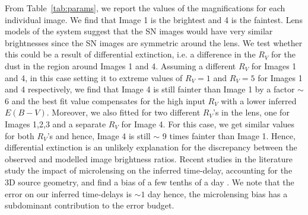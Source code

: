 \documentclass[a4paper,fleqn,usenatbib]{mnras}
\begin{document}
From Table~\ref{tab:params}, we report the values of the magnifications for each individual image. We find that Image 1 is the brightest and 4 is the faintest. Lens models of the system \citep[e.g.][M{\"o}rtsell et al. in prep.]{2017ApJ...835L..25M} suggest that the SN images would have very similar brightnesses since the SN images are symmetric around the lens. We test whether this could be a result of differential extinction, i.e. a difference in the $R_V$ for the dust in the region around Images 1 and 4. Assuming a different $R_V$ for Images 1 and 4, in this case setting it to extreme values of $R_V = 1$ and $R_V = 5$ for Images 1 and 4 respectively, we find that Image 4 is still fainter than Image 1 by a factor $\sim$ 6 and the best fit value compensates for the high input $R_V$ with a lower inferred $E(B-V)$. Moreover, we also fitted for two different $R_V$'s in the lens, one for Images 1,2,3 and a separate $R_V$ for Image 4. For this case, we get similar values for both $R_V$'s and hence, Image 4 is still $\sim$ 9 times fainter than Image 1.  Hence, differential extinction is an unlikely explanation for the discrepancy between the observed and modelled image brightness ratios. Recent studies in the literature study the impact of microlensing on the inferred time-delay, accounting for the 3D source geometry, and find a bias of a few tenths of a day \citep{2019A&A...621A..55B}. We note that the error on our inferred time-delays is $\sim 1$ day hence, the microlensing bias has a subdominant contribution to the error budget.
\end{document}
